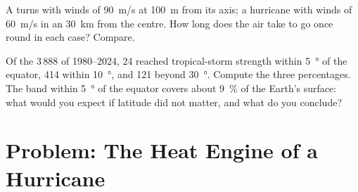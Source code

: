 \begin{exercise}[$\star\star\star$]\label{exo:g10:storms-and-cyclones:14}
A  turns with winds of \qty{90}{m/s} at \qty{100}{m} from its axis;
a hurricane with winds of \qty{60}{m/s} in an  \qty{30}{km} from the
centre. How long does the air take to go once round in each case? Compare.
\end{exercise}

\begin{exercise}[$\star\star\star$]\label{exo:g10:storms-and-cyclones:15}
Of the 3\,888  of 1980--2024, 24 reached tropical-storm
strength within \qty{5}{\degree} of the equator, 414 within
\qty{10}{\degree}, and 121 beyond \qty{30}{\degree}. Compute the three
percentages. The band within \qty{5}{\degree} of the equator covers about
\qty{9}{\percent} of the Earth's surface: what would you expect if latitude
did not matter, and what do you conclude?
\end{exercise}

\section{Problem: The Heat Engine of a Hurricane}


